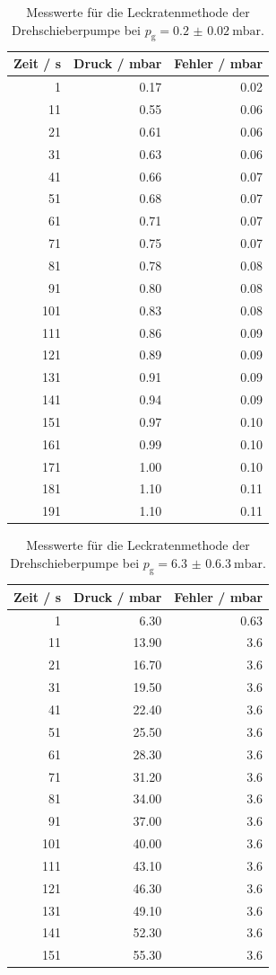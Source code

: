 \begin{table}[H]
\centering
\caption{Messwerte für die Leckratenmethode der Drehschieberpumpe bei $p_\text{g} = \qty{0,2(0.02)}{\milli\bar}$.}
\label{tab:11}
\begin{tabular}{rrr}
\toprule
Zeit / s & Druck / mbar & Fehler / mbar \\
\midrule
1 & 0.17 & 0.02 \\
11 & 0.55 & 0.06 \\
21 & 0.61 & 0.06 \\
31 & 0.63 & 0.06 \\
41 & 0.66 & 0.07 \\
51 & 0.68 & 0.07 \\
61 & 0.71 & 0.07 \\
71 & 0.75 & 0.07 \\
81 & 0.78 & 0.08 \\
91 & 0.80 & 0.08 \\
101 & 0.83 & 0.08 \\
111 & 0.86 & 0.09 \\
121 & 0.89 & 0.09 \\
131 & 0.91 & 0.09 \\
141 & 0.94 & 0.09 \\
151 & 0.97 & 0.10 \\
161 & 0.99 & 0.10 \\
171 & 1.00 & 0.10 \\
181 & 1.10 & 0.11 \\
191 & 1.10 & 0.11 \\
\bottomrule
\end{tabular}
\end{table}

\begin{table}[H]
  \centering
\caption{Messwerte für die Leckratenmethode der Drehschieberpumpe bei $p_\text{g} = \qty{6.3(0.63)}{\milli\bar}$.}
\label{tab:12} 
\begin{tabular}{rrr}
\toprule
Zeit / s & Druck / mbar & Fehler / mbar \\
\midrule
1 & 6.30 & 0.63 \\
11 & 13.90 & 3.6 \\
21 & 16.70 & 3.6 \\
31 & 19.50 & 3.6 \\
41 & 22.40 & 3.6 \\
51 & 25.50 & 3.6 \\
61 & 28.30 & 3.6 \\
71 & 31.20 & 3.6 \\
81 & 34.00 & 3.6 \\
91 & 37.00 & 3.6 \\
101 & 40.00 & 3.6 \\
111 & 43.10 & 3.6 \\
121 & 46.30 & 3.6 \\
131 & 49.10 & 3.6 \\
141 & 52.30 & 3.6 \\
151 & 55.30 & 3.6 \\
\bottomrule
\end{tabular}
\end{table}

